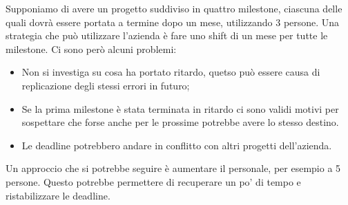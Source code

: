 Supponiamo di avere un progetto suddiviso in quattro milestone, ciascuna delle quali dovrà essere portata a termine dopo un mese, utilizzando 3 persone. Una strategia che può utilizzare l'azienda è fare uno shift di un mese per tutte le milestone. Ci sono però alcuni problemi:
\begin{itemize}
	\item Non si investiga su cosa ha portato ritardo, quetso può essere causa di replicazione degli stessi errori in futuro;
	\item Se la prima milestone è stata terminata in ritardo ci sono validi motivi per sospettare che forse anche per le prossime potrebbe avere lo stesso destino.
	\item Le deadline potrebbero andare in conflitto con altri progetti dell'azienda.
\end{itemize}
Un approccio che si potrebbe seguire è aumentare il personale, per esempio a 5 persone. Questo potrebbe permettere di recuperare un po' di tempo e ristabilizzare le deadline.
